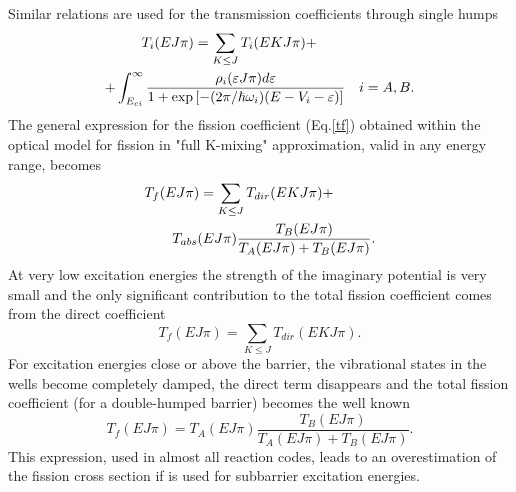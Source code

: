 Similar relations are used for the transmission coefficients through single
humps
\begin{eqnarray}
T_{i}(EJ\pi)=\sum_{K\le J}T_{i}(EKJ\pi) +\qquad\qquad\qquad\quad  \notag \\
+ \int_{E_{ci}}^{\infty} \frac {\rho_{i}(\varepsilon J\pi)d\varepsilon} {%
1+\exp\left[ -({2\pi}/\hbar\omega_{i}) (E-V_{i}-\varepsilon)\right] } \quad
i=A,B.  \label{tfi}
\end{eqnarray}
The general expression for the fission coefficient (Eq.\ref{tf}) obtained
within the optical model for fission in "full K-mixing" approximation, valid
in any energy range, becomes
\begin{eqnarray}
T_{f}(EJ\pi)=\sum_{K\le J}T_{dir}(EKJ\pi)+\qquad\quad  \notag \\
T_{abs}(E J \pi)\frac{T_{B}(E J \pi)}{T_{A}(E J \pi)+T_{B}(E J \pi)}.
\label{tfis}
\end{eqnarray}
At very low excitation energies the strength of the imaginary potential is
very small and the only significant contribution to the total fission
coefficient comes from the direct coefficient
\begin{equation}
T_{f}(EJ\pi)=\sum_{K\le J}T_{dir}(EKJ\pi).  \label{tf-zero}
\end{equation}
For excitation energies close or above the barrier, the vibrational states
in the wells become completely damped, the direct term disappears and the
total fission coefficient (for a double-humped barrier) becomes the well
known
\begin{equation}
T_{f}(E J \pi)=T_{A}(E J \pi)\frac{T_{B}(E J \pi)}{T_{A}(E J \pi)+T_{B}(E J
\pi)}.  \label{tf-full}
\end{equation}
This expression, used in almost all reaction codes, leads to an
overestimation of the fission cross section if is used for subbarrier
excitation energies.

